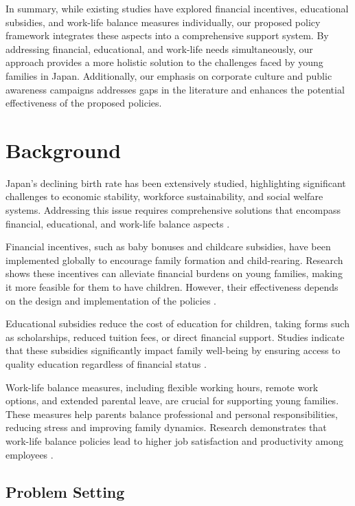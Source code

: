 \documentclass{article} %
\begin{document}
In summary, while existing studies have explored financial incentives, educational subsidies, and work-life balance measures individually, our proposed policy framework integrates these aspects into a comprehensive support system. By addressing financial, educational, and work-life needs simultaneously, our approach provides a more holistic solution to the challenges faced by young families in Japan. Additionally, our emphasis on corporate culture and public awareness campaigns addresses gaps in the literature and enhances the potential effectiveness of the proposed policies.

\section{Background}
\label{sec:background}

Japan's declining birth rate has been extensively studied, highlighting significant challenges to economic stability, workforce sustainability, and social welfare systems. Addressing this issue requires comprehensive solutions that encompass financial, educational, and work-life balance aspects \citep{poledna2023economic}.

Financial incentives, such as baby bonuses and childcare subsidies, have been implemented globally to encourage family formation and child-rearing. Research shows these incentives can alleviate financial burdens on young families, making it more feasible for them to have children. However, their effectiveness depends on the design and implementation of the policies \citep{zhou2023peer}.

Educational subsidies reduce the cost of education for children, taking forms such as scholarships, reduced tuition fees, or direct financial support. Studies indicate that these subsidies significantly impact family well-being by ensuring access to quality education regardless of financial status \citep{west2023agent}.

Work-life balance measures, including flexible working hours, remote work options, and extended parental leave, are crucial for supporting young families. These measures help parents balance professional and personal responsibilities, reducing stress and improving family dynamics. Research demonstrates that work-life balance policies lead to higher job satisfaction and productivity among employees \citep{shanahan2023role}.

\subsection{Problem Setting}
\label{sec:problem_setting}
\end{document}

